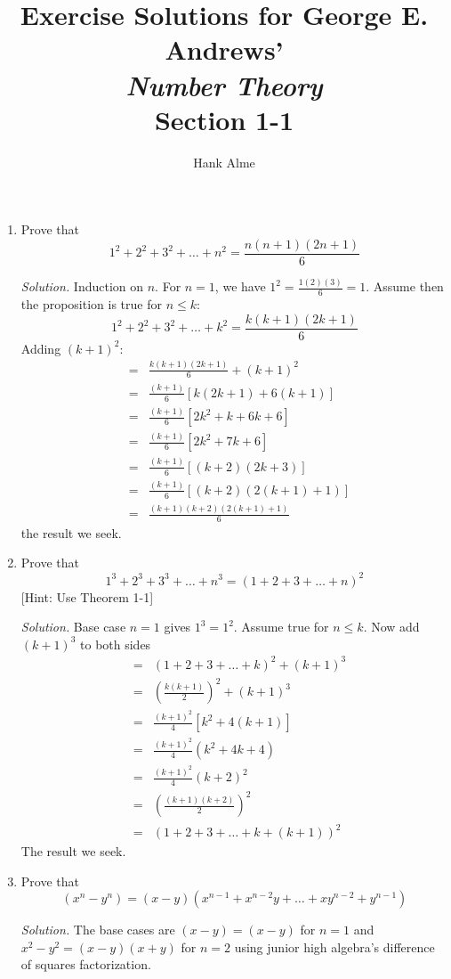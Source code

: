 \documentclass[12pt]{article}
\title{Exercise Solutions for George E. Andrews' \\
  {\em Number Theory} \\
Section 1-1}
\author{Hank Alme}
\newcommand\sol[1]{\begin{mdframed}
\emph{Solution.} #1
\end{mdframed}}
\begin{document}
\maketitle

\begin{enumerate}
\item Prove that
  \[
  1^2 + 2^2 + 3^2 + \ldots + n^2 = \frac{n(n+1)(2n+1)}{6}
  \]

  \sol{Induction on $n$. For $n =1$, we have $1^2 = \frac{1(2)(3)}{6} = 1$. Assume then the proposition is true for $n \le k$:
    \[
1^2 + 2^2 + 3^2 + \ldots + k^2 = \frac{k(k+1)(2k+1)}{6}
\]
Adding $(k+1)^2$:
\begin{align*}
  &=&\frac{k(k+1)(2k+1)}{6} + (k+1)^2 \\
  &=&\frac{(k+1)}{6} [ k(2k+1) + 6(k+1) ] \\
  &=&\frac{(k+1)}{6} [ 2k^2+k + 6k+6 ]\\
  &=&\frac{(k+1)}{6} [ 2k^2+7k +6 ]\\
  &=&\frac{(k+1)}{6} [ (k+2)(2k+3) ]\\
  &=&\frac{(k+1)}{6} [ (k+2)(2(k+1)+1) ]\\
  &=&\frac{(k+1)(k+2)(2(k+1)+1)}{6}  
\end{align*}
the result we seek.
}

\item Prove that
  \[
  1^3 + 2^3 + 3^3 + \ldots + n^3 = (1+2+3+\ldots+n)^2
  \]
    [Hint: Use Theorem 1-1]

    \sol{Base case $n=1$ gives $1^3 = 1^2$. Assume true for $n \le
      k$. Now add $(k+1)^3$ to both sides
      \begin{align*}
        &=& (1+2+3+\ldots+k)^2 + (k+1)^3 \\
        &=& \left (\frac{k(k+1)}{2} \right)^2 + (k+1)^3  \\
        &=& \frac{(k+1)^2}{4} [k^2 + 4(k+1)] \\
        &=& \frac{(k+1)^2}{4} (k^2 + 4k+4) \\
        &=& \frac{(k+1)^2}{4} (k+2)^2 \\
        &=& \left (\frac{(k+1)(k+2)}{2} \right)^2 \\
        &=& (1+2+3+\ldots+k+(k+1))^2 
      \end{align*}
      The result we seek.}


  \item Prove that
    \[
    (x^n - y^n) = (x-y)(x^{n-1} + x^{n-2}y + \ldots +xy^{n-2}+y^{n-1})
    \]

    \sol{
      The base cases are $(x-y) = (x-y)$ for $n=1$ and $x^2 - y^2 = (x-y)(x+y)$ for $n=2$ using junior high algebra's difference of squares factorization.
      
}
\end{enumerate}
\end{document}
